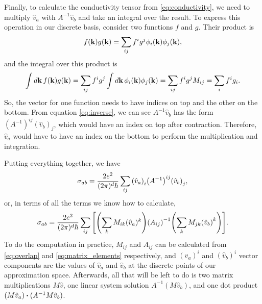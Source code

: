 \documentclass[12pt]{article}
\begin{document}
Finally, to calculate the conductivity tensor from \eqref{eq:conductivity}, we need to multiply
$\hat{v}_a$ with $A^{-1}\hat{v}_b$ and take an integral over the result. To express this operation
in our discrete basis, consider two functions $f$ and $g$. Their product is
\begin{equation}
    f(\vb{k})g(\vb{k}) = \sum_{ij} f^i g^j \phi_i(\vb{k}) \phi_j(\vb{k}),
\end{equation}
and the integral over this product is
\begin{equation}
    \int\dd{\vb{k}} f(\vb{k}) g(\vb{k}) = \sum_{ij} f^i g^j \int\dd{\vb{k}}
    \phi_i(\vb{k})\phi_j(\vb{k}) = \sum_{ij} f^i g^j M_{ij} = \sum_i f^i g_i.
\end{equation}
So, the vector for one function needs to have indices on top and the other on the bottom. From
equation \eqref{eq:inverse}, we can see $A^{-1}\hat{v}_b$ has the form
$(A^{-1})^{ij} (\hat{v}_b)_j$, which would have an index on top after contraction. Therefore,
$\hat{v}_a$ would have to have an index on the bottom to perform the multiplication and integration.

Putting everything together, we have
\begin{equation}
    \sigma_{ab} = \frac{2e^2}{(2\pi)^d\hbar} \sum_{ij} \qty(\hat{v}_a)_i
    \qty(A^{-1})^{ij} \qty(\hat{v}_b)_j,
\end{equation}
or, in terms of all the terms we know how to calculate,
\begin{equation}
    \sigma_{ab} = \frac{2e^2}{(2\pi)^d\hbar} \sum_{ij} \qty[
    \qty(\sum_k M_{ik} (\hat{v}_a)^k) \qty(A_{ij})^{-1} \qty(\sum_k M_{jk} \qty(\hat{v}_b)^k)].
\end{equation}
To do the computation in practice, $M_{ij}$ and $A_{ij}$ can be calculated from \eqref{eq:overlap}
and \eqref{eq:matrix_elements} respectively, and $(\hat{v}_a)^i$ and $(\hat{v}_b)^i$ vector
components are the values of $\hat{v}_a$ and $\hat{v}_b$ at the discrete points of our approximation
space.  Afterwards, all that will be left to do is two matrix multiplications $M\hat{v}$, one linear
system solution $A^{-1}(M\hat{v}_b)$, and one dot product $(M\hat{v}_a)\vdot(A^{-1}M\hat{v}_b)$.
\end{document}
